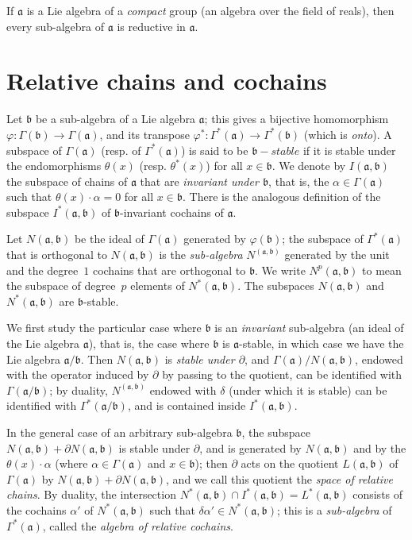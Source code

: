 \documentclass{article}
\newcommand{\fk}{\mathfrak}
\newcommand{\oldpage}[1]{\marginpar{\footnotesize$\Big\vert$ \textit{p.~#1}}}
\begin{document}
If $\fk{a}$ is a Lie algebra of a \emph{compact} group (an algebra over the field of reals), then every sub-algebra of $\fk{a}$ is reductive in $\fk{a}$.


\section{Relative chains and cochains}
\label{III.1}

Let $\fk{b}$ be a sub-algebra of a Lie algebra $\fk{a}$;
this gives a bijective homomorphism $\varphi\colon\Gamma(\fk{b})\to\Gamma(\fk{a})$, and its transpose $\varphi^*\colon\Gamma^*(\fk{a})\to\Gamma^*(\fk{b})$ (which is \emph{onto}).
A subspace of $\Gamma(\fk{a})$ (resp. of $\Gamma^*(\fk{a})$) is said to be \emph{$\fk{b}-stable$} if it is stable under the endomorphisms $\theta(x)$ (resp. $\theta^*(x)$) for all $x\in\fk{b}$.
We denote by $I(\fk{a},\fk{b})$ the subspace of chains of $\fk{a}$ that are \emph{invariant under $\fk{b}$}, that is, the $\alpha\in\Gamma(\fk{a})$ such that $\theta(x)\cdot\alpha=0$ for all $x\in\fk{b}$.
There is the analogous definition of the subspace $I^*(\fk{a},\fk{b})$ of $\fk{b}$-invariant cochains of $\fk{a}$.

\oldpage{72}
Let $N(\fk{a},\fk{b})$ be the ideal of $\Gamma(\fk{a})$ generated by $\varphi(\fk{b})$;
the subspace of $\Gamma^*(\fk{a})$ that is orthogonal to $N(\fk{a},\fk{b})$ is the \emph{sub-algebra} $N^(\fk{a},\fk{b})$ generated by the unit and the degree~$1$ cochains that are orthogonal to $\fk{b}$.
We write $N^p(\fk{a},\fk{b})$ to mean the subspace of degree~$p$ elements of $N^*(\fk{a},\fk{b})$.
The subspaces $N(\fk{a},\fk{b})$ and $N^*(\fk{a},\fk{b})$ are $\fk{b}$-stable.

We first study the particular case where $\fk{b}$ is an \emph{invariant} sub-algebra (an ideal of the Lie algebra $\fk{a}$), that is, the case where $\fk{b}$ is $\fk{a}$-stable, in which case we have the Lie algebra $\fk{a}/\fk{b}$.
Then $N(\fk{a},\fk{b})$ is \emph{stable under $\partial$}, and $\Gamma(\fk{a})/N(\fk{a},\fk{b})$, endowed with the operator induced by $\partial$ by passing to the quotient, can be identified with $\Gamma(\fk{a}/\fk{b})$;
by duality, $N^(\fk{a},\fk{b})$ endowed with $\delta$ (under which it is stable) can be identified with $\Gamma^*(\fk{a}/\fk{b})$, and is contained inside $I^*(\fk{a},\fk{b})$.

In the general case of an arbitrary sub-algebra $\fk{b}$, the subspace $N(\fk{a},\fk{b})+\partial N(\fk{a},\fk{b})$ is stable under $\partial$, and is generated by $N(\fk{a},\fk{b})$ and by the $\theta(x)\cdot\alpha$ (where $\alpha\in\Gamma(\fk{a})$ and $x\in\fk{b}$);
then $\partial$ acts on the quotient $L(\fk{a},\fk{b})$ of $\Gamma(\fk{a})$ by $N(\fk{a},\fk{b})+\partial N(\fk{a},\fk{b})$, and we call this quotient the \emph{space of relative chains}.
By duality, the intersection $N^*(\fk{a},\fk{b})\cap I^*(\fk{a},\fk{b}) = L^*(\fk{a},\fk{b})$ consists of the cochains $\alpha'$ of $N^*(\fk{a},\fk{b})$ such that $\delta\alpha'\in N^*(\fk{a},\fk{b})$;
this is a \emph{sub-algebra} of $\Gamma^*(\fk{a})$, called the \emph{algebra of relative cochains}.
\end{document}
